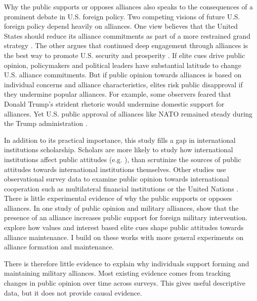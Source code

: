\documentclass[12pt]{article}
\begin{document}
Why the public supports or opposes alliances also speaks to the consequences of a prominent debate in U.S. foreign policy. 
Two competing visions of future U.S. foreign policy depend heavily on alliances. 
One view believes that the United States should reduce its alliance commitments as part of a more restrained grand strategy \citep{Preble2009, Posen2014}.
The other argues that continued deep engagement through alliances is the best way to promote U.S. security and prosperity \citep{Brooksetal2013, BrandsFeaver2017}. 
If elite cues drive public opinion, policymakers and political leaders have substantial latitude to change U.S. alliance commitments. 
But if public opinion towards alliances is based on individual concerns and alliance characteristics, elites risk public disapproval if they undermine popular alliances.  
For example, some observers feared that Donald Trump's strident rhetoric would undermine domestic support for alliances.
Yet U.S. public approval of alliances like NATO remained steady during the Trump administration \citep{PewNATO2020}. 


In addition to its practical importance, this study fills a gap in international institutions scholarship. 
Scholars are more likely to study how international institutions affect public attitudes (e.g. \citep{KayaWalker2014, Greenhill2020}), than scrutinize the sources of public attitudes towards international institutions themselves. 
Other studies use observational survey data to examine public opinion towards international cooperation such as multilateral financial institutions \citep{Edwards2009} or the United Nations \citep{Torgler2008, DellmuthTallberg2015}. 
There is little experimental evidence of why the public supports or opposes alliances.
In one study of public opinion and military alliances, \citet{TomzWeeks2021} show that the presence of an alliance increases public support for foreign military intervention. 
\citet{Chuetal2021} explore how values and interest based elite cues shape public attitudes towards alliance maintenance. 
I build on these works with more general experiments on alliance formation and maintenance. 


There is therefore little evidence to explain why individuals support forming and maintaining military alliances. 
Most existing evidence comes from tracking changes in public opinion over time across surveys.
This gives useful descriptive data, but it does not provide causal evidence.
\end{document}
